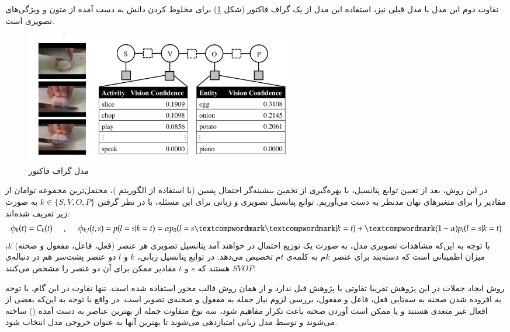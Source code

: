 تفاوت دوم این مدل با مدل قبلی نیز، استفاده این مدل از یک گراف فاکتور 
(شکل \ref{text-mined-knowledge-model-2})
برای مخلوط کردن دانش به دست آمده از متون و ویژگی‌های تصویری است.
\begin{figure}[h]
	\centering
	\includegraphics[width=120mm]{images/FactorGraph.png}
	\caption{مدل گراف فاکتور \label{text-mined-knowledge-model-2} \cite{Thomason2014}}
\end{figure}
در این روش، بعد از تعیین‌ توابع پتانسیل، با بهره‌گیری از تخمین بیشینه‌گر احتمال پسین 
(با استفاده از الگوریتم )، محتمل‌ترین مجموعه توامان از مقادیر را برای متغیر‌های نهان مد‌نظر به دست می‌آوریم. توابع پتانسیل تصویری و زبانی برای این مسئله، با در نظر گرفتن
$k \in \{S, V, O, P\}$
به صورت زیر تعریف شده‌اند:
\begin{equation}
 \phi_{k}(t) = C_k(t) \hspace{5mm}, \hspace{5mm} \phi_{k, l}(t, s)  = p(l = s | k = t) = \alpha p_0(l = s‌‌ | k = t) +‌(1 - \alpha) p_i (l = s | k = t)
\end{equation}
با توجه به این‌که مشاهدات تصویری مدل، به صورت یک توزیع احتمال در خواهند آمد پتانسیل تصویری هر عنصر (فعل، فاعل، مفعول و صحنه) $k$، میزان اطمینانی است که دسته‌بند برای عنصر $k$م به کلمه‌ی $t$م تخصیص می‌دهد.
در توابع پتانسیل زبانی، $k$ و $l$ دو عنصر پشت‌سر هم در دنباله‌ی $SVOP$ هستند که $s$ و $t$ مقادیر ممکن‌‌ برای آن دو عنصر را مشخص می‌کنند.

روش ایجاد جملات در این پژوهش تقریبا تفاوتی با پژوهش قبل ندارد و از همان روش قالب محور استفاده شده است.  تنها تفاوت در این گام، با توجه به افزوده شدن صحنه‌ به سه‌تایی فعل، فاعل و مفعول، بررسی لزوم نیاز جمله به  مفعول و صحنه‌ی تصویر است. در واقع با توجه به این‌که بعضی از افعال غیر متعدی هستند و یا ممکن است آوردن صحنه باعث تکرار مفاهیم شود، سه نوع متفاوت جمله از بهترین عناصر به دست آمده () ساخته می‌شوند و توسط مدل زبانی 
\cite{pauls2011faster}
امتیازدهی می‌شوند تا بهترین آنها به عنوان خروجی مدل انتخاب شود.

